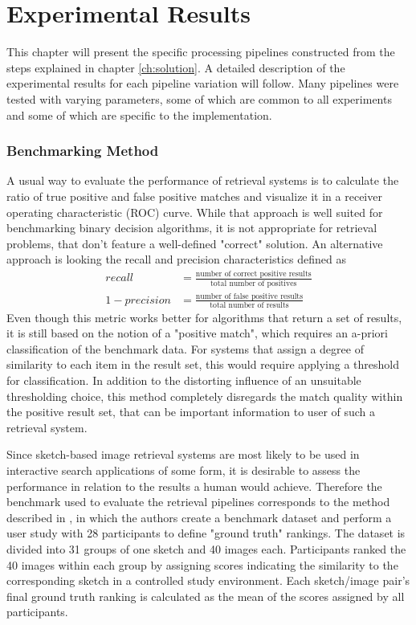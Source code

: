 \chapter{Experimental Results}\label{ch:results}

This chapter will present the specific processing pipelines constructed from
the steps explained in chapter \ref{ch:solution}. A detailed description of the
experimental results for each pipeline variation will follow. Many pipelines
were tested with varying parameters, some of which are common to all
experiments and some of which are specific to the implementation.

\subsection{Benchmarking Method}

A usual way to evaluate the performance of retrieval systems is to calculate
the ratio of true positive and false positive matches and visualize it in a
receiver operating characteristic (ROC) curve. While that approach is well
suited for benchmarking binary decision algorithms, it is not appropriate for
retrieval problems, that don't feature a well-defined "correct" solution. An
alternative approach is looking the recall and precision characteristics
defined as
\begin{align*}
    recall & = \frac{\text{number of correct positive results}}{\text{total number of positives}} \\
    1 - precision & = \frac{\text{number of false positive results}}{\text{total number of results}}
\end{align*}
Even though this metric works better for algorithms that return a set of
results, it is still based on the notion of a "positive match", which requires
an a-priori classification of the benchmark data. For systems that assign a
degree of similarity to each item in the result set, this would require
applying a threshold for classification. In addition to the distorting
influence of an unsuitable thresholding choice, this method completely
disregards the match quality within the positive result set, that can be
important information to user of such a retrieval system.

Since sketch-based image retrieval systems are most likely to be used in
interactive search applications of some form, it is desirable to assess the
performance in relation to the results a human would achieve.  Therefore the
benchmark used to evaluate the retrieval pipelines corresponds to the method
described in \autocite{eitz_sketch-based_2010}, in which the authors create a
benchmark dataset and perform a user study with 28 participants to define
"ground truth" rankings. The dataset is divided into 31 groups of one sketch
and 40 images each. Participants ranked the 40 images within each group by
assigning scores indicating the similarity to the corresponding sketch in a
controlled study environment. Each sketch/image pair's final ground truth
ranking is calculated as the mean of the scores assigned by all participants.

